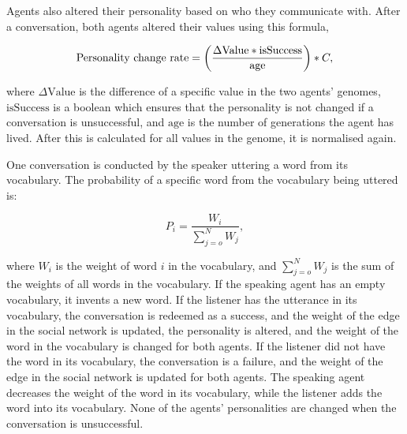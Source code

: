 Agents also altered their personality based on who they communicate with. After a conversation, both agents altered their values using this formula,

\begin{equation}\label{eq:PCR}
\text{Personality change rate} = \left( \frac{\Delta \text{Value} \ast \text{isSuccess}}{\text{age}} \right)\ast C,
\end{equation}

where $\Delta \text{Value}$ is the difference of a specific value in the two agents' genomes, $\text{isSuccess}$ is a boolean which ensures that the personality is not changed if a conversation is unsuccessful, and $\text{age}$ is the number of generations the agent has lived. After this is calculated for all values in the genome, it is normalised again.

One conversation is conducted by the speaker uttering a word from its vocabulary. The probability of a specific word from the vocabulary being uttered is:

\begin{equation}\label{eq:chooseWordprob}
P_{i} = \frac{W_{i}}{\sum_{j=o}^{N}W_{j}},
\end{equation}

where $W_{i}$ is the weight of word $i$ in the vocabulary, and $\sum_{j=o}^{N}W_{j}$ is the sum of the weights of all words in the vocabulary. If the speaking agent has an empty vocabulary, it invents a new word. If the listener has the utterance in its vocabulary, the conversation is redeemed as a success, and the weight of the edge in the social network is updated, the personality is altered, and the weight of the word in the vocabulary is changed for both agents. If the listener did not have the word in its vocabulary, the conversation is a failure, and the weight of the edge in the social network is updated for both agents. The speaking agent decreases the weight of the word in its vocabulary, while the listener adds the word into its vocabulary. None of the agents' personalities are changed when the conversation is unsuccessful.

